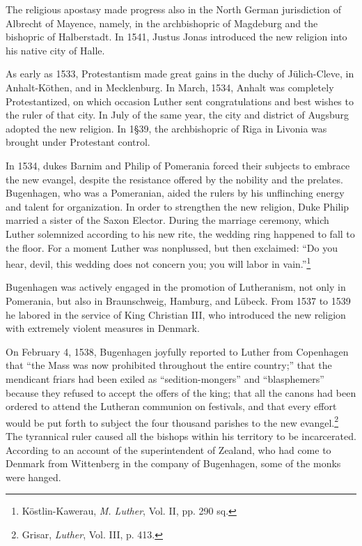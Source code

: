 The religious apostasy made progress also in the North German
jurisdiction of Albrecht of Mayence, namely, in the archbishopric of
Magdeburg and the bishopric of Halberstadt. In 1541, Justus Jonas
introduced the new religion into his native city of Halle.

As early as 1533, Protestantism made great gains in the duchy of
Jülich-Cleve, in Anhalt-Köthen, and in Mecklenburg. In March,
1534, Anhalt was completely Protestantized, on which occasion Luther
sent congratulations and best wishes to the ruler of that city. In July
of the same year, the city and district of Augsburg adopted the new
religion. In 1§39, the archbishopric of Riga in Livonia was brought
under Protestant control.

In 1534, dukes Barnim and Philip of Pomerania forced their subjects to
embrace the new evangel, despite the resistance offered by
the nobility and the prelates. Bugenhagen, who was a Pomeranian,
aided the rulers by his unflinching energy and talent for organization.
In order to strengthen the new religion, Duke Philip married a sister
of the Saxon Elector. During the marriage ceremony, which Luther
solemnized according to his new rite, the wedding ring happened to
fall to the floor. For a moment Luther was nonplussed, but then exclaimed:
“Do you hear, devil, this wedding does not concern you; you
will labor in vain.”\footnote{Köstlin-Kawerau, \textit{M. Luther}, Vol. II, pp. 290 sq.}


Bugenhagen was actively engaged in the promotion of Lutheranism,
not only in Pomerania, but also in Braunschweig, Hamburg, and
Lübeck. From 1537 to 1539 he labored in the service of King Christian
III, who introduced the new religion with extremely violent
measures in Denmark.

On February 4, 1538, Bugenhagen joyfully reported to Luther from
Copenhagen that “the Mass was now prohibited throughout the entire
country;” that the mendicant friars had been exiled as “sedition-mongers”
and “blasphemers” because they refused to accept the offers of the king;
that all the canons had been ordered to attend the Lutheran communion on
festivals, and that every effort would be put forth to subject the four
thousand parishes to the new evangel.\footnote{Grisar, \textit{Luther}, Vol. III, p. 413.}
 The tyrannical ruler caused all the
bishops within his territory to be incarcerated. According to an account of
the superintendent of Zealand, who had come to Denmark from Wittenberg
in the company of Bugenhagen, some of the monks were hanged.

